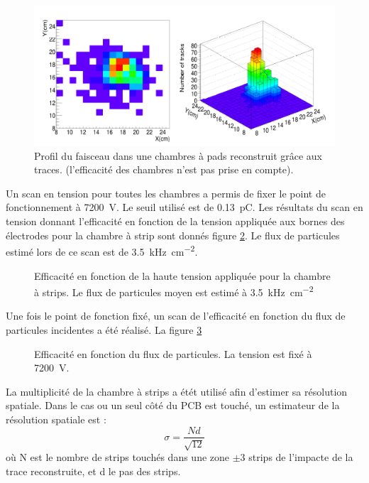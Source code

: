 \begin{figure}
	\centering
	\includegraphics[width=0.8\linewidth]{GLA/FaisceauPS.png}
	\caption{Profil du faisceau dans une chambres à pads reconstruit grâce aux traces. (l'efficacité des chambres n'est pas prise en compte).}
	\label{faisceauPS}
\end{figure}

Un scan en tension pour toutes les chambres a permis de fixer le point de fonctionnement à \SI{7200}{\volt}. Le seuil utilisé est de \SI{0.13}{\pico\coulomb}. Les résultats du scan en tension donnant l'efficacité en fonction de la tension appliquée aux bornes des électrodes pour la chambre à strip sont donnés figure \ref{ScanTensionPS}. Le flux de particules estimé lors de ce scan est de \SI{3.5}{\kilo\hertz\per\square\centi\meter}.

\begin{figure}[!ht]
	\centering
	\scalebox{1.4}{}
	\caption{Efficacité en fonction de la haute tension appliquée pour la chambre à strips. Le flux de particules moyen est estimé à \SI{3.5}{\kilo\hertz\per\square\centi\meter}}
	\label{ScanTensionPS}
\end{figure}

Une fois le point de fonction fixé, un scan de l'efficacité en fonction du flux de particules incidentes a été réalisé. La figure \ref{ScanRatePS}

\begin{figure}[!ht]
	\centering
	\scalebox{1.4}{}
	\caption{Efficacité en fonction du flux de particules. La tension est fixé à \SI{7200}{\volt}.}
	\label{ScanRatePS}
\end{figure}

La multiplicité de la chambre à strips a étét utilisé afin d'estimer sa résolution spatiale. Dans le cas ou un seul côté du PCB est touché, un estimateur de la résolution spatiale est :
\begin{equation}
\sigma=\frac{Nd}{\sqrt{12}}
\end{equation}
où N est le nombre de strips touchés dans une zone $\pm 3$ strips de l'impacte de la trace reconstruite, et d le pas des strips.

